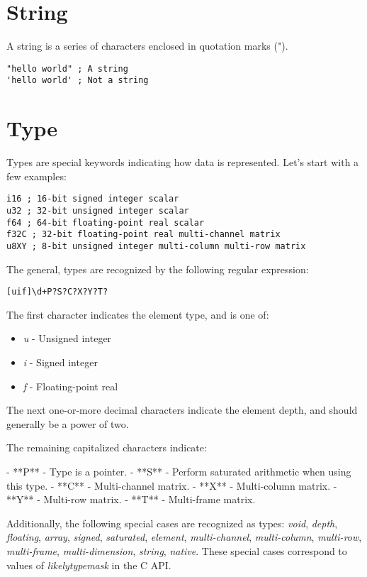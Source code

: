 \documentclass[twoside=false, numbers=noenddot]{scrbook}
\begin{document}
\section{String}
A string is a series of characters enclosed in quotation marks (").

\begin{verbatim}
"hello world" ; A string
'hello world' ; Not a string
\end{verbatim}

\section{Type}
Types are special keywords indicating how data is represented.
Let's start with a few examples:

\begin{verbatim}
i16 ; 16-bit signed integer scalar
u32 ; 32-bit unsigned integer scalar
f64 ; 64-bit floating-point real scalar
f32C ; 32-bit floating-point real multi-channel matrix
u8XY ; 8-bit unsigned integer multi-column multi-row matrix
\end{verbatim}

The general, types are recognized by the following regular expression:

\begin{verbatim}
[uif]\d+P?S?C?X?Y?T?
\end{verbatim}

The first character indicates the element type, and is one of:

\begin{itemize}
\item \emph{u} - Unsigned integer
\item \emph{i} - Signed integer
\item \emph{f} - Floating-point real
\end{itemize}

The next one-or-more decimal characters indicate the element depth, and should generally be a power of two.

The remaining capitalized characters indicate:

- **P** - Type is a pointer.
- **S** - Perform saturated arithmetic when using this type.
- **C** - Multi-channel matrix.
- **X** - Multi-column matrix.
- **Y** - Multi-row matrix.
- **T** - Multi-frame matrix.

Additionally, the following special cases are recognized as types: \emph{void}, \emph{depth}, \emph{floating}, \emph{array}, \emph{signed}, \emph{saturated}, \emph{element}, \emph{multi-channel}, \emph{multi-column}, \emph{multi-row}, \emph{multi-frame}, \emph{multi-dimension}, \emph{string}, \emph{native}.
These special cases correspond to values of \emph{likely\emph{type}mask} in the C API.
\end{document}
